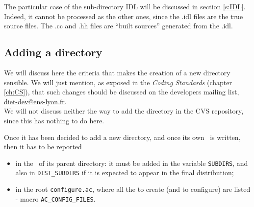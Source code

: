\noindent
{} The particular case of the sub-directory \textsf{IDL} will be
discussed in section \ref{s:IDL}. Indeed, it cannot be processed as the other
ones, since the \textsf{.idl} files are the true source files. The \textsf{.cc}
and \textsf{.hh} files are ``built sources'' generated from the \textsf{.idl}.



\subsection{Adding a directory}

We will discuss here the criteria that makes the creation of a new directory
sensible. We will just mention, as exposed in the \textit{Coding Standards}
(chapter \ref{ch:CS}), that such changes should be discussed on the developers
mailing list, \url{diet-dev@ens-lyon.fr}.
\\
We will not discuss neither the way to add the directory in the CVS repository,
since this has nothing to do here.

Once it has been decided to add a new directory, and once its own \makeam\ is
written, then it has to be reported
\begin{itemize}
\item in the \makeam\ of its parent directory: it must be added in the variable
  \texttt{SUBDIRS}, and also in \texttt{DIST\_SUBDIRS} if it is expected to
  appear in the final distribution;
\item in the root \texttt{configure.ac}, where all the \makein to create (and to
  configure) are listed - macro \texttt{AC\_CONFIG\_FILES}.
\end{itemize}

